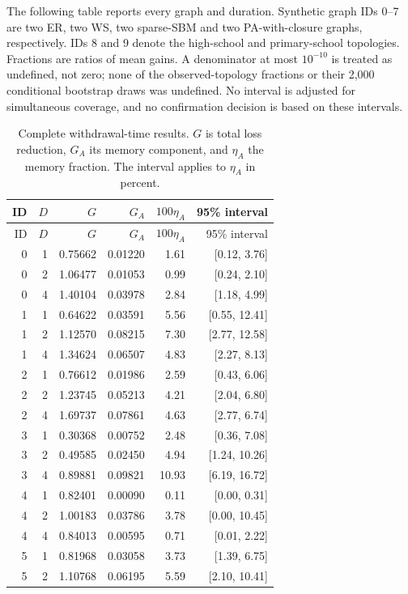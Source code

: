 \documentclass[preprint,11pt,sort&compress]{elsarticle}
\begin{document}
The following table reports every graph and duration. Synthetic graph IDs 0--7 are two ER, two WS, two sparse-SBM and two PA-with-closure graphs, respectively. IDs 8 and 9 denote the high-school and primary-school topologies. Fractions are ratios of mean gains. A denominator at most $10^{-10}$ is treated as undefined, not zero; none of the observed-topology fractions or their 2,000 conditional bootstrap draws was undefined. No interval is adjusted for simultaneous coverage, and no confirmation decision is based on these intervals.
\begin{longtable}{rrrrrr}
\caption{Complete withdrawal-time results. $G$ is total loss reduction, $G_A$ its memory component, and $\eta_A$ the memory fraction. The interval applies to $\eta_A$ in percent.}\label{tab:withdrawal_all}\\
\toprule ID & $D$ & $G$ & $G_A$ & $100\eta_A$ & 95\% interval\\\midrule\endfirsthead
\toprule ID & $D$ & $G$ & $G_A$ & $100\eta_A$ & 95\% interval\\\midrule\endhead
0 & 1 & 0.75662 & 0.01220 & 1.61 & [0.12, 3.76]\\
0 & 2 & 1.06477 & 0.01053 & 0.99 & [0.24, 2.10]\\
0 & 4 & 1.40104 & 0.03978 & 2.84 & [1.18, 4.99]\\
1 & 1 & 0.64622 & 0.03591 & 5.56 & [0.55, 12.41]\\
1 & 2 & 1.12570 & 0.08215 & 7.30 & [2.77, 12.58]\\
1 & 4 & 1.34624 & 0.06507 & 4.83 & [2.27, 8.13]\\
2 & 1 & 0.76612 & 0.01986 & 2.59 & [0.43, 6.06]\\
2 & 2 & 1.23745 & 0.05213 & 4.21 & [2.04, 6.80]\\
2 & 4 & 1.69737 & 0.07861 & 4.63 & [2.77, 6.74]\\
3 & 1 & 0.30368 & 0.00752 & 2.48 & [0.36, 7.08]\\
3 & 2 & 0.49585 & 0.02450 & 4.94 & [1.24, 10.26]\\
3 & 4 & 0.89881 & 0.09821 & 10.93 & [6.19, 16.72]\\
4 & 1 & 0.82401 & 0.00090 & 0.11 & [0.00, 0.31]\\
4 & 2 & 1.00183 & 0.03786 & 3.78 & [0.00, 10.45]\\
4 & 4 & 0.84013 & 0.00595 & 0.71 & [0.01, 2.22]\\
5 & 1 & 0.81968 & 0.03058 & 3.73 & [1.39, 6.75]\\
5 & 2 & 1.10768 & 0.06195 & 5.59 & [2.10, 10.41]\\

\end{longtable}
\end{document}

